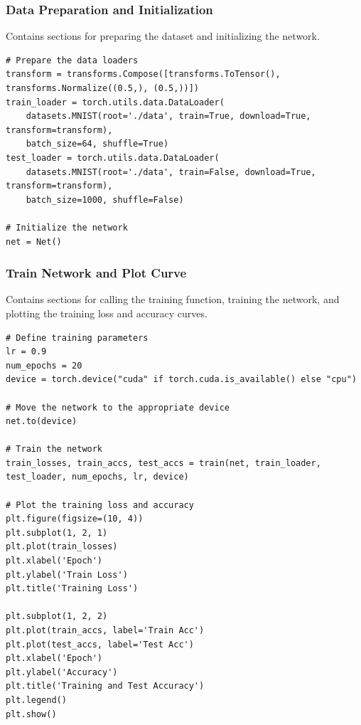 \documentclass[a4paper,12pt]{article}
\begin{document}
\subsubsection{Data Preparation and Initialization}
Contains sections for preparing the dataset and initializing the network.
\begin{lstlisting}
# Prepare the data loaders
transform = transforms.Compose([transforms.ToTensor(), transforms.Normalize((0.5,), (0.5,))])
train_loader = torch.utils.data.DataLoader(
    datasets.MNIST(root='./data', train=True, download=True, transform=transform),
    batch_size=64, shuffle=True)
test_loader = torch.utils.data.DataLoader(
    datasets.MNIST(root='./data', train=False, download=True, transform=transform),
    batch_size=1000, shuffle=False)

# Initialize the network
net = Net()
\end{lstlisting}

\subsubsection{Train Network and Plot Curve}
Contains sections for calling the training function, training the network, and plotting the training loss and accuracy curves.
\begin{lstlisting}
# Define training parameters
lr = 0.9
num_epochs = 20
device = torch.device("cuda" if torch.cuda.is_available() else "cpu")

# Move the network to the appropriate device
net.to(device)

# Train the network
train_losses, train_accs, test_accs = train(net, train_loader, test_loader, num_epochs, lr, device)

# Plot the training loss and accuracy
plt.figure(figsize=(10, 4))
plt.subplot(1, 2, 1)
plt.plot(train_losses)
plt.xlabel('Epoch')
plt.ylabel('Train Loss')
plt.title('Training Loss')

plt.subplot(1, 2, 2)
plt.plot(train_accs, label='Train Acc')
plt.plot(test_accs, label='Test Acc')
plt.xlabel('Epoch')
plt.ylabel('Accuracy')
plt.title('Training and Test Accuracy')
plt.legend()
plt.show()

\end{lstlisting}
\end{document}
